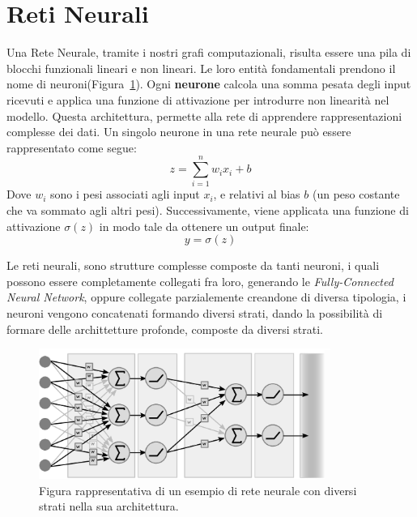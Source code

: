 \section{Reti Neurali}
Una Rete Neurale, tramite i nostri grafi computazionali, risulta essere una pila di blocchi funzionali lineari e non lineari. Le loro entità fondamentali prendono il nome di neuroni(Figura~\ref{fig:neuralNet}). Ogni \textbf{neurone} calcola una somma pesata degli input ricevuti e applica una funzione di attivazione per introdurre non linearità nel modello. Questa architettura, permette alla rete di apprendere rappresentazioni complesse dei dati. Un singolo neurone in una rete neurale può essere rappresentato come segue:
\begin{equation}
    z = \sum_{i=1}^{n} w_i x_i + b
\end{equation}
Dove $w_i$ sono i pesi associati agli input $x_i$, e relativi al bias $b$ (un peso costante che va sommato agli altri pesi). Successivamente, viene applicata una funzione di attivazione $\sigma(z)$ in modo tale da ottenere un output finale:
\begin{equation}
    y = \sigma(z)
\end{equation}

Le reti neurali, sono strutture complesse composte da tanti neuroni, i quali possono essere completamente collegati fra loro, generando le \textit{Fully-Connected Neural Network}, oppure collegate parzialemente creandone di diversa tipologia, i neuroni vengono concatenati formando diversi strati, dando la possibilità di formare delle archittetture profonde, composte da diversi strati.

\begin{figure}[ht]
    \centering
    \includegraphics[width=0.85\textwidth]{figure/NeuralNet.png}
    \caption{Figura rappresentativa di un esempio di rete neurale con diversi strati nella sua architettura.}
    \label{fig:neuralNet}
\end{figure}

